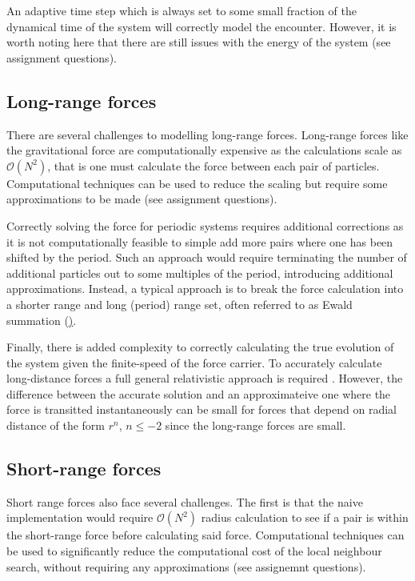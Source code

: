 \par 
An adaptive time step which is always set to some small fraction of the dynamical time of the system will correctly model the encounter. However, it is worth noting here that there are still issues with the energy of the system (see assignment questions). 

\subsection{Long-range forces}
\label{sec:nbody:longrange}
There are several challenges to modelling long-range forces. Long-range forces like the gravitational force are computationally expensive as the calculations scale as $\mathcal{O}(N^2)$, that is one must calculate the force between each pair of particles. Computational techniques can be used to reduce the scaling but require some approximations to be made (see assignment questions).

\par 
Correctly solving the force for periodic systems requires additional corrections as it is not computationally feasible to simple add more pairs where one has been shifted by the period. Such an approach would require terminating the number of additional particles out to some multiples of the period, introducing additional approximations. Instead, a typical approach is to break the force calculation into a shorter range and long (period) range set, often referred to as Ewald summation (\href{see https://en.wikipedia.org/wiki/Ewald_summation}). 

\par 
Finally, there is added complexity to correctly calculating the true evolution of the system given the finite-speed of the force carrier. To accurately calculate long-distance forces a full general relativistic approach is required \cite{grnbody}. However, the difference between the accurate solution and an approximateive one where the force is transitted instantaneously can be small for forces that depend on radial distance of the form $r^{n}$, $n\leq-2$ since the long-range forces are small\cite{grcorrections}.

\subsection{Short-range forces}
\label{sec:nbody:shortrange}
Short range forces also face several challenges. The first is that the naive implementation would require 
$\mathcal{O}(N^2)$ radius calculation to see if a pair is within the short-range force before calculating said force. Computational techniques can be used to significantly reduce the computational cost of the local neighbour search, without requiring any approximations (see assignemnt questions).


